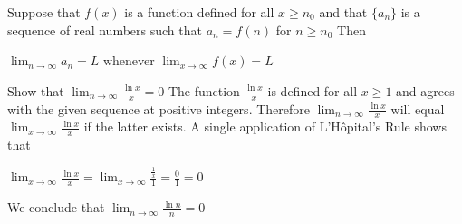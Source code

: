 \documentclass[12pt,a4paper]{article}
\newenvironment{theorem}{\begin{theorembox}}{\end{theorembox}\vspace{1\baselineskip}}
\newcommand{\lopital}{L'Hôpital's Rule }
\begin{document}
\begin{theorem}
    Suppose that $f(x)$ is a function defined for all $x \geq n_0 $ and that $\{a_n\}$  is a sequence of real numbers such that $a_n = f(n)$ for $n \geq n_0$ Then
    \begin{center}
        $\lim_{n \to \infty}a_n = L$ whenever $\lim_{x \to \infty} f(x) = L$
    \end{center}
\end{theorem}
\medskip
\begin{example}
    Show that $\lim_{n \to \infty} \frac{\ln x}{x}=0$
    The function $\frac{\ln x}{x}$ is defined for all $x \geq 1$ and agrees with the given sequence at positive integers. Therefore $\lim_{n \to \infty}\frac{\ln x }{x}$ will equal $\lim_{x \to \infty} \frac{\ln x}{x} $ if the latter exists. A single application of \lopital shows that
    \begin{center}
        $\lim_{x \to \infty}\frac{\ln x}{x} = \lim_{x \to \infty}\frac{\frac{1}{x}}{1} = \frac{0}{1} = 0$
    \end{center}
    We conclude that $\lim_{n \to \infty}\frac{\ln n}{n} = 0 $
\end{example}
\newpage
\end{document}
